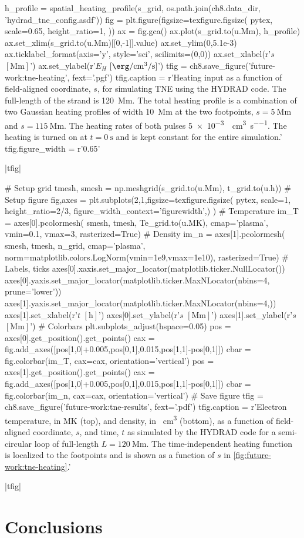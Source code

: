 \begin{pycode}[chapter8]
h_profile = spatial_heating_profile(s_grid, os.path.join(ch8.data_dir, 'hydrad_tne_config.asdf'))
fig = plt.figure(figsize=texfigure.figsize(
    pytex,
    scale=0.65,
    height_ratio=1,
))
ax = fig.gca()
ax.plot(s_grid.to(u.Mm), h_profile)
ax.set_xlim(s_grid.to(u.Mm)[[0,-1]].value)
ax.set_ylim(0,5.1e-3)
ax.ticklabel_format(axis='y', style='sci', scilimits=(0,0))
ax.set_xlabel(r'$s$ $[\si{\mega\m}]$')
ax.set_ylabel(r'$E_H$ $[\si{\erg\per\cubic\cm\per\second}]$')
tfig = ch8.save_figure('future-work:tne-heating', fext='.pgf')
tfig.caption = r'Heating input as a function of field-aligned coordinate, $s$, for simulating TNE using the HYDRAD code. The full-length of the strand is \SI{120}{\mega\m}. The total heating profile is a combination of two Gaussian heating profiles of width \SI{10}{\mega\m} at the two footpoints, $s=\SI{5}{\mega\m}$ and $s=\SI{115}{\mega\m}$. The heating rates of both pulses \SI{5e-3}{\erg\per\cubic\cm\per\second}. The heating is turned on at $t=\SI{0}{\second}$ and is kept constant for the entire simulation.'
tfig.figure_width = r'0.65\textwidth'
\end{pycode}
\py[chapter8]|tfig|

\begin{pycode}[chapter8]
# Setup grid
tmesh, smesh = np.meshgrid(s_grid.to(u.Mm), t_grid.to(u.h))
# Setup figure
fig,axes = plt.subplots(2,1,figsize=texfigure.figsize(
    pytex,
    scale=1,
    height_ratio=2/3,
    figure_width_context='figurewidth',)
)
# Temperature
im_T = axes[0].pcolormesh(
    smesh, tmesh, Te_grid.to(u.MK),
    cmap='plasma',
    vmin=0.1,
    vmax=3,
    rasterized=True)
# Density
im_n = axes[1].pcolormesh(
    smesh, tmesh, n_grid,
    cmap='plasma',
    norm=matplotlib.colors.LogNorm(vmin=1e9,vmax=1e10),
    rasterized=True)
# Labels, ticks
axes[0].xaxis.set_major_locator(matplotlib.ticker.NullLocator())
axes[0].yaxis.set_major_locator(matplotlib.ticker.MaxNLocator(nbins=4, prune='lower'))
axes[1].yaxis.set_major_locator(matplotlib.ticker.MaxNLocator(nbins=4,))
axes[1].set_xlabel(r'$t$ $[\si{\hour}]$')
axes[0].set_ylabel(r'$s$ $[\si{\mega\m}]$')
axes[1].set_ylabel(r'$s$ $[\si{\mega\m}]$')
# Colorbars
plt.subplots_adjust(hspace=0.05)
pos = axes[0].get_position().get_points()
cax = fig.add_axes([pos[1,0]+0.005,pos[0,1],0.015,pos[1,1]-pos[0,1]])
cbar = fig.colorbar(im_T, cax=cax, orientation='vertical')
pos = axes[1].get_position().get_points()
cax = fig.add_axes([pos[1,0]+0.005,pos[0,1],0.015,pos[1,1]-pos[0,1]])
cbar = fig.colorbar(im_n, cax=cax, orientation='vertical')
# Save figure
tfig = ch8.save_figure('future-work:tne-results', fext='.pdf')
tfig.caption = r'Electron temperature, in \si{\mega\kelvin} (top), and density, in \si{\per\cubic\cm} (bottom), as a function of field-aligned coordinate, $s$, and time, $t$ as simulated by the HYDRAD code for a semi-circular loop of full-length $L=\SI{120}{\mega\m}$. The time-independent heating function is localized to the footpoints and is shown as a function of $s$ in \autoref{fig:future-work:tne-heating}.'
\end{pycode}
\py[chapter8]|tfig|

\section{Conclusions}\label{sec:conclusions}
